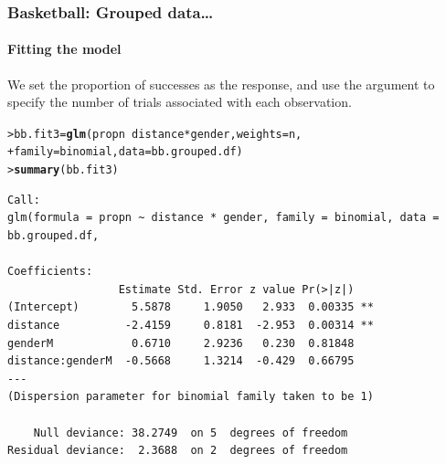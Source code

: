 \documentclass{beamer}\usepackage[]{graphicx}\usepackage[]{xcolor}
\makeatletter
\newcommand{\hlopt}[1]{\textcolor[rgb]{0,0,0}{#1}}%
\newcommand{\hlstd}[1]{\textcolor[rgb]{0.345,0.345,0.345}{#1}}%
\newcommand{\hlkwb}[1]{\textcolor[rgb]{0.69,0.353,0.396}{#1}}%
\newcommand{\hlkwc}[1]{\textcolor[rgb]{0.333,0.667,0.333}{#1}}%
\newcommand{\hlkwd}[1]{\textcolor[rgb]{0.737,0.353,0.396}{\textbf{#1}}}%
\newenvironment{kframe}{%
 \def\at@end@of@kframe{}%
 \ifinner\ifhmode%
  \def\at@end@of@kframe{\end{minipage}}%
  \begin{minipage}{\columnwidth}%
 \fi\fi%
 \def\FrameCommand##1{\hskip\@totalleftmargin \hskip-\fboxsep
 \colorbox{shadecolor}{##1}\hskip-\fboxsep
     \hskip-\linewidth \hskip-\@totalleftmargin \hskip\columnwidth}%
 \MakeFramed {\advance\hsize-\width
   \@totalleftmargin\z@ \linewidth\hsize
   \@setminipage}}%
 {\par\unskip\endMakeFramed%
 \at@end@of@kframe}
\newenvironment{knitrout}{}{} %
\makeatother
\begin{document}
\begin{frame}[fragile]
\frametitle{Basketball: Grouped data\ldots}
\framesubtitle{Fitting the model}
We set the proportion of successes as the response, and use the argument  to specify the number of trials associated with each observation.

\begin{knitrout}\scriptsize
{}\color{fgcolor}\begin{kframe}
\begin{alltt}
\hlstd{> }\hlstd{bb.fit3} \hlkwb{=} \hlkwd{glm}\hlstd{(propn} \hlopt{~} \hlstd{distance} \hlopt{*} \hlstd{gender,} \hlkwc{weights} \hlstd{= n,}
\hlstd{+ }              \hlkwc{family} \hlstd{= binomial,} \hlkwc{data} \hlstd{= bb.grouped.df)}
\hlstd{> }\hlkwd{summary}\hlstd{(bb.fit3)}
\end{alltt}
\end{kframe}
\end{knitrout}

\begin{knitrout}\scriptsize
{}\color{fgcolor}\begin{kframe}
\begin{verbatim}
Call:
glm(formula = propn ~ distance * gender, family = binomial, data = bb.grouped.df, 

Coefficients:
                 Estimate Std. Error z value Pr(>|z|)   
(Intercept)        5.5878     1.9050   2.933  0.00335 **
distance          -2.4159     0.8181  -2.953  0.00314 **
genderM            0.6710     2.9236   0.230  0.81848   
distance:genderM  -0.5668     1.3214  -0.429  0.66795   
---
(Dispersion parameter for binomial family taken to be 1)

    Null deviance: 38.2749  on 5  degrees of freedom
Residual deviance:  2.3688  on 2  degrees of freedom
\end{verbatim}
\end{kframe}
\end{knitrout}


\end{frame}
\end{document}
